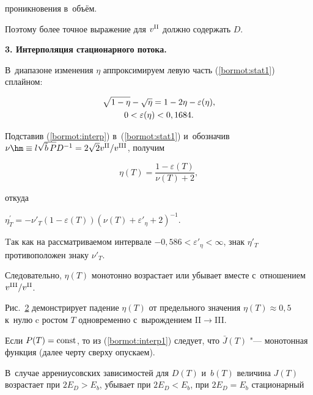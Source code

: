 \noindent проникновения в~объём.

Поэтому более точное выражение для $v^{\rm II}$ должно содержать $D$.



\smallskip



\textbf{3. Интерполяция стационарного потока.} 

В~диапазоне изменения $\eta$ аппроксимируем левую часть (\ref{bormot:stat1}) сплайном:

\begin{gather}\label{bormot:interp}

\sqrt{1-\eta}-\sqrt{\eta}=1-2\eta-\varepsilon(\eta), \\

\notag

 0<\varepsilon(\eta)<0,1684.

\end{gather}

Подставив (\ref{bormot:interp}) в~(\ref{bormot:stat1}) и~обозначив $\nu\hm\equiv l \sqrt{\tilde b\,P}{D}^{-1}=2\sqrt{2}v^{\rm II}/v^{\rm III}$, получим

\begin{equation}\label{bormot:interp1}

\eta(T)=\frac{1-\varepsilon(T)}{\nu(T)+2},

\end{equation}

откуда

${\eta}^{'}_T=-\nu'_T(1-\varepsilon(T))(\nu(T)+\varepsilon'_{\eta}+2)^{-1}.$



Tак как на рассматриваемом интервале $-0,586<\varepsilon'_{\eta}<\infty$, знак $\eta'_T$ противоположен знаку $\nu'_T$.

Следовательно, $\eta(T)$  монотонно возрастает или убывает вместе с~отношением $v^{\rm III}/v^{\rm II}$.

Рис.~\hyperlink{bormota:1}{2} демонстрирует падение $\eta(T)$  от предельного значения $\eta(T)\approx0,5$ к~нулю c ростом $T$ одновременно с~вырождением II$\rightarrow$III.







Если $P(T)={\rm const}$, то из (\ref{bormot:interp1}) следует, что $\bar J(T)$ "--- монотонная функция (далее черту сверху опускаем).

В~случае аррениусовских зависимостей для $D(T)$ и~$b(T)$ величина $J(T)$ возрастает при $2E_D>E_b$, убывает при \mbox{$2E_D<E_b$}, при $2E_D=E_b$ стационарный

